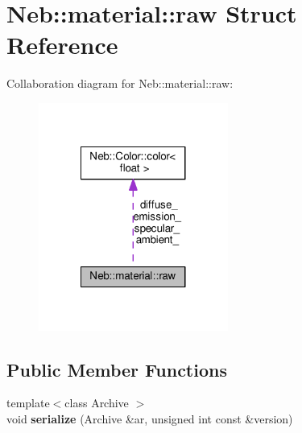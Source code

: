 \hypertarget{structNeb_1_1material_1_1raw}{\section{Neb\-:\-:material\-:\-:raw Struct Reference}
\label{structNeb_1_1material_1_1raw}
}


Collaboration diagram for Neb\-:\-:material\-:\-:raw\-:
\nopagebreak
\begin{figure}[H]
\begin{center}
\leavevmode
\includegraphics[width=176pt]{structNeb_1_1material_1_1raw__coll__graph}
\end{center}
\end{figure}
\subsection*{Public Member Functions}
\begin{DoxyCompactItemize}
\item 
\hypertarget{structNeb_1_1material_1_1raw_a020d5d21bc692dcba3a8d2dec53871e1}{{\footnotesize template$<$class Archive $>$ }\\void {\bfseries serialize} (Archive \&ar, unsigned int const \&version)}\label{structNeb_1_1material_1_1raw_a020d5d21bc692dcba3a8d2dec53871e1}

\end{DoxyCompactItemize}
